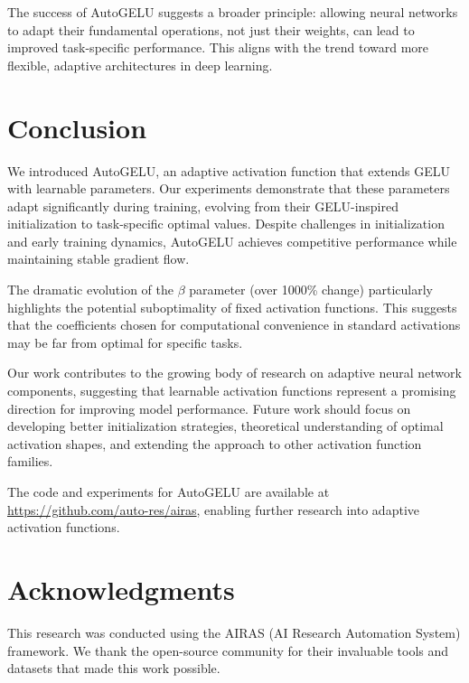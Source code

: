 \documentclass{article} %
\begin{document}
The success of AutoGELU suggests a broader principle: allowing neural networks to adapt their fundamental operations, not just their weights, can lead to improved task-specific performance. This aligns with the trend toward more flexible, adaptive architectures in deep learning.

\section{Conclusion}

We introduced AutoGELU, an adaptive activation function that extends GELU with learnable parameters. Our experiments demonstrate that these parameters adapt significantly during training, evolving from their GELU-inspired initialization to task-specific optimal values. Despite challenges in initialization and early training dynamics, AutoGELU achieves competitive performance while maintaining stable gradient flow.

The dramatic evolution of the $\beta$ parameter (over 1000\% change) particularly highlights the potential suboptimality of fixed activation functions. This suggests that the coefficients chosen for computational convenience in standard activations may be far from optimal for specific tasks.

Our work contributes to the growing body of research on adaptive neural network components, suggesting that learnable activation functions represent a promising direction for improving model performance. Future work should focus on developing better initialization strategies, theoretical understanding of optimal activation shapes, and extending the approach to other activation function families.

The code and experiments for AutoGELU are available at \url{https://github.com/auto-res/airas}, enabling further research into adaptive activation functions.

\section*{Acknowledgments}

This research was conducted using the AIRAS (AI Research Automation System) framework. We thank the open-source community for their invaluable tools and datasets that made this work possible.



\end{document}
